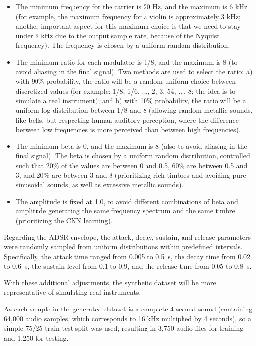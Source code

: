 \documentclass[10pt,conference]{IEEEtran}
\begin{document}
\begin{itemize}
    \item The minimum frequency for the carrier is 20 Hz, and the maximum is 6 kHz (for example, the maximum frequency for a violin is approximately 3 kHz; another important aspect for this maximum choice is that we need to stay under 8 kHz due to the output sample rate, because of the Nyquist frequency). The frequency is chosen by a uniform random distribution.
    \item The minimum ratio for each modulator is 1/8, and the maximum is 8 (to avoid aliasing in the final signal). Two methods are used to select the ratio: a) with 90\% probability, the ratio will be a random uniform choice between discretized values (for example: 1/8, 1/6, ..., 2, 3, 54, ..., 8; the idea is to simulate a real instrument); and b) with 10\% probability, the ratio will be a uniform log distribution between 1/8 and 8 (allowing random metallic sounds, like bells, but respecting human auditory perception, where the difference between low frequencies is more perceived than between high frequencies).
    \item The minimum beta is 0, and the maximum is 8 (also to avoid aliasing in the final signal). The beta is chosen by a uniform random distribution, controlled such that 20\% of the values are between 0 and 0.5, 60\% are between 0.5 and 3, and 20\% are between 3 and 8 (prioritizing rich timbres and avoiding pure sinusoidal sounds, as well as excessive metallic sounds).
    \item The amplitude is fixed at 1.0, to avoid different combinations of beta and amplitude generating the same frequency spectrum and the same timbre (prioritizing the CNN learning).
\end{itemize}

Regarding the ADSR envelope, the attack, decay, sustain, and release parameters were randomly sampled from uniform distributions within predefined intervals. Specifically, the attack time ranged from 0.005 to 0.5~s, the decay time from 0.02 to 0.6~s, the sustain level from 0.1 to 0.9, and the release time from 0.05 to 0.8~s.

With these additional adjustments, the synthetic dataset will be more representative of simulating real instruments.

As each sample in the generated dataset is a complete 4-second sound (containing 64,000 audio samples, which corresponds to 16 kHz multiplied by 4 seconds), so a simple 75/25 train-test split was used, resulting in 3,750 audio files for training and 1,250 for testing.
\end{document}
